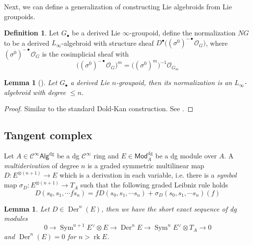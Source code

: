 \documentclass[12pt]{amsart}
\newtheorem{lem}[thm]{Lemma}
\theoremstyle{definition}
\newtheorem{defn}[thm]{Definition}
\theoremstyle{remark}
\numberwithin{equation}{section}
\newcommand{\CO}{{\mathcal O}}
\newcommand{\1}{{\mathbb{1}}}
\newcommand{\Mod}{\mathsf{Mod}}
\newcommand{\bt}{\bullet}
\newcommand{\dg}{{\operatorname{dg}}}
\newcommand{\cialg}{\mathcal{C}^{\infty}\mathsf{Alg}}
\newcommand{\ci}{\mathcal{C}^{\infty}}
\newcommand{\der}{\operatorname{Der}}
\newcommand{\rk}{\operatorname{rk}}
\newcommand{\sym}{\operatorname{Sym}}
\begin{document}
    
    Next, we can define a generalization of constructing Lie algebroids from Lie groupoids.
    \begin{defn}
        Let $G_{\bt}$ be a derived Lie $\infty$-groupoid, define the normalization $NG$ to be a derived $L_{\infty}$-algebroid with structure sheaf $D^{\bt}\big((\sigma^0)^{-\bt} \CO_G\big)$, where $(\sigma^0)^{-\bt} \CO_G$ is the cosimplicial sheaf with 
        \begin{equation*}
            \big((\sigma^0)^{-\bt} \CO_G\big)^m = \big((\sigma^0)^m\big)^{-1}\CO_{G_m}
        \end{equation*}
    \end{defn}
    
    \begin{lem}[\cite{Pri20a}]
        Let $G_{\bt}$ a derived Lie $n$-groupoid, then its normalization is an $L_{\infty}$-algebroid with degree $\le n$. 
    \end{lem}
    \begin{proof}
    Similar to the standard Dold-Kan construction. See \cite[Lemma 4.17]{Pri20a}.
    \end{proof}


\subsection{Tangent complex}

Let $A\in \cialg^{\dg}$ be a dg $\ci$ ring and $E\in\Mod_A^{\dg}$ be a dg module over $A$. A {\it multiderivation} of degree $n$ is a graded symmetric multilinear map
$D: E^{\otimes(n+1)} \to E$
which is a derivation in each variable, i.e. there is a {\it symbol} map $\sigma_{D}:E^{\otimes(n+1)} \to T_A$ such that the following graded Leibniz rule holds
\begin{equation}
D(s_0,s_1,\cdots fs_n) = f  D(s_0,s_1,\cdots s_n) + \sigma_{D}(s_0,s_1,\cdots s_n)(f)
\end{equation} 

\begin{lem}
	Let $D \in \der^n(E)$, then we have the short exact sequence of dg modules
	\begin{equation}
	0 \to \sym^{n+1} E^{\vee} \otimes E \to \der^n E \to \sym^n E^{\vee} \otimes T_A \to 0 
	\end{equation}
	and $\der^n(E)=0$ for $n> \rk E$. 
\end{lem}
\end{document}

